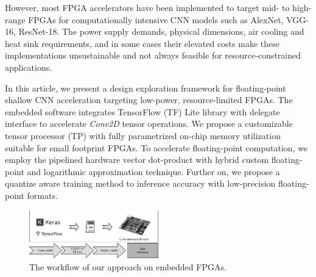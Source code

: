However, most FPGA accelerators have been implemented to target mid- to high-range FPGAs for computationally intensive CNN models such as AlexNet, VGG-16, ResNet-18. The power supply demands, physical dimensions, air cooling and heat sink requirements, and in some cases their elevated costs make these implementations unsustainable and not always feasible for resource-constrained applications.


In this article, we present a design exploration framework for floating-point shallow CNN acceleration targeting low-power, resource-limited FPGAs. The embedded software integrates TensorFlow (TF) Lite library with delegate interface to accelerate \emph{Conv2D} tensor operations. We propose a customizable tensor processor (TP) with fully parametrized on-chip memory utilization suitable for small footprint FPGAs. To accelerate floating-point computation, we employ the pipelined hardware vector dot-product with hybrid custom floating-point and logarithmic approximation technique\cite{nevarez2021accelerating}. Further on, we propose a quantize aware training method to  inference accuracy with low-precision floating-point formats.

\begin{figure}[t!]
	\centering
	\includegraphics[width=0.5\textwidth]{../figures/workflow.pdf}
	\caption{The workflow of our approach on embedded FPGAs.}
	\label{fig:workflow}
\end{figure}

